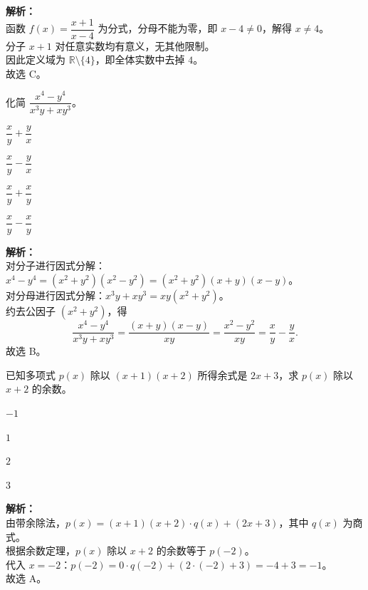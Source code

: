 \documentclass[12pt,a4paper]{exam-zh}
\begin{document}
\begin{solution}
    \textbf{解析：} \\
    函数 $f(x)=\dfrac{x+1}{x-4}$ 为分式，分母不能为零，即 $x-4\ne 0$，解得 $x\ne 4$。 \\
    分子 $x+1$ 对任意实数均有意义，无其他限制。 \\
    因此定义域为 $\mathbb{R}\setminus\{4\}$，即全体实数中去掉 $4$。 \\
    故选 C。
\end{solution}

\begin{question}
    化简 $\dfrac{x^4-y^4}{x^3y+xy^3}$。\paren[B]
    \begin{choices}
        \item $\dfrac{x}{y}+\dfrac{y}{x}$
        \item $\dfrac{x}{y}-\dfrac{y}{x}$
        \item $\dfrac{x}{y}+\dfrac{x}{y}$
        \item $\dfrac{x}{y}-\dfrac{x}{y}$
    \end{choices}
\end{question}

\begin{solution}
    \textbf{解析：} \\
    对分子进行因式分解：$x^4-y^4=(x^2+y^2)(x^2-y^2)=(x^2+y^2)(x+y)(x-y)$。 \\
    对分母进行因式分解：$x^3y+xy^3=xy(x^2+y^2)$。 \\
    约去公因子 $(x^2+y^2)$，得
    \[
        \frac{x^4-y^4}{x^3y+xy^3}=\frac{(x+y)(x-y)}{xy}=\frac{x^2-y^2}{xy}=\frac{x}{y}-\frac{y}{x}.
    \]
    故选 B。
\end{solution}

\begin{question}
    已知多项式 $p(x)$ 除以 $(x+1)(x+2)$ 所得余式是 $2x+3$，求 $p(x)$ 除以 $x+2$ 的余数。\paren[A]
    \begin{choices}
        \item $-1$ \item $1$ \item $2$ \item $3$
    \end{choices}
\end{question}

\begin{solution}
    \textbf{解析：} \\
    由带余除法，$p(x)=(x+1)(x+2)\cdot q(x)+(2x+3)$，其中 $q(x)$ 为商式。 \\
    根据余数定理，$p(x)$ 除以 $x+2$ 的余数等于 $p(-2)$。 \\
    代入 $x=-2$：$p(-2)=0\cdot q(-2)+(2\cdot(-2)+3)=-4+3=-1$。 \\
    故选 A。
\end{solution}
\end{document}
